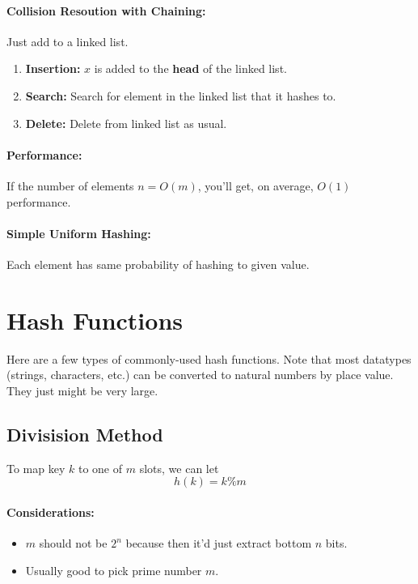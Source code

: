 \documentclass[a4paper,12pt]{report}
\begin{document}
\paragraph{Collision Resoution with Chaining: } Just add to a linked list. 
\begin{enumerate}
\item \textbf{Insertion: } $x$ is added to the \textbf{head} of the linked list.
\item \textbf{Search: } Search for element in the linked list that it hashes to.
\item \textbf{Delete: } Delete from linked list as usual.
\end{enumerate}

\paragraph{Performance: } If the number of elements $n = O(m)$, you'll get, on average, $O(1)$ performance. 

\paragraph{Simple Uniform Hashing: } Each element has same probability of hashing to given value. 


\section{Hash Functions}

Here are a few types of commonly-used hash functions. Note that most datatypes (strings, characters, etc.) can be converted to natural numbers by place value. They just might be very large. 

\subsection{Divisision Method}

To map key $k$ to one of $m$ slots, we can let 
\begin{equation}
h(k) = k \% m
\end{equation}

\paragraph{Considerations: } 
\begin{itemize}
\item $m$ should not be $2^n$ because then it'd just extract bottom $n$ bits. 
\item Usually good to pick prime number $m$.
\end{itemize}
\end{document}
